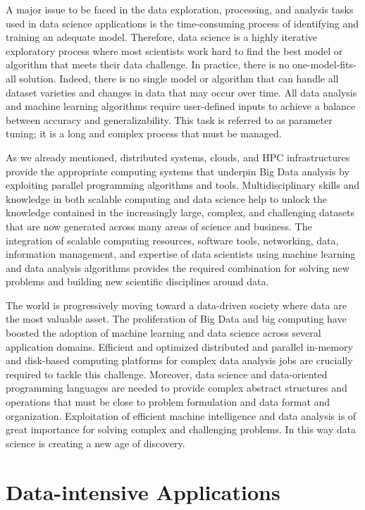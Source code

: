 A major issue to be faced in the data exploration, processing, and analysis tasks used in data science applications is the time-consuming process of identifying and training an adequate model. Therefore, data science is a highly iterative exploratory process where most scientists work hard to find the best model or algorithm that meets their data challenge. In practice, there is no one-model-fits-all solution. Indeed, there is no single model or algorithm that can handle all dataset varieties and changes in data that may occur over time. All data analysis and machine learning algorithms require user-defined inputs to achieve a balance between accuracy and generalizability. This task is referred to as parameter tuning; it is a long and complex process that must be managed.

As we already mentioned, distributed systems, clouds, and HPC infrastructures provide the appropriate computing systems that underpin Big Data analysis by exploiting parallel programming algorithms and tools. Multidisciplinary skills and knowledge in both scalable computing and data science help to unlock the knowledge contained in the increasingly large, complex, and challenging datasets that are now generated across many areas of science and business. The integration of scalable computing resources, software tools, networking, data, information management, and expertise of data scientists using machine learning and data analysis algorithms provides the required combination for solving new problems and building new scientific disciplines around data.

The world is progressively moving toward a data-driven society where data are the most valuable asset. The proliferation of Big Data and big computing have boosted the adoption of machine learning and data science across several application domains. Efficient and optimized distributed and parallel in-memory and disk-based computing platforms for complex data analysis jobs are crucially required to tackle this challenge. Moreover, data science and data-oriented programming languages are needed to provide complex abstract structures and operations that must be close to problem formulation and data format and organization. Exploitation of efficient machine intelligence and data analysis is of great importance for solving complex and challenging problems. In this way data science is creating a new age of discovery.

\section{\label{sec:3.7}Data-intensive Applications}


